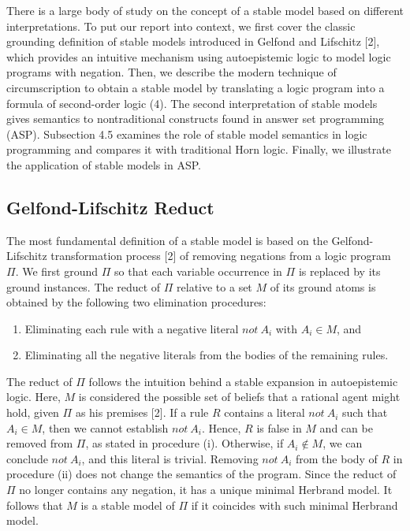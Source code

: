 There is a large body 
of study on the concept of a stable model based on different interpretations. To put our report into 
context, we first cover the classic grounding definition of stable models introduced in Gelfond and Lifschitz [2], 
which provides an intuitive mechanism using autoepistemic logic to model logic programs with negation. 
Then, we describe the modern  
technique of circumscription to obtain a stable model by translating a logic program 
into a formula of second-order logic (4). The second interpretation of stable models gives semantics 
to nontraditional constructs found in answer set programming (ASP). Subsection 4.5 examines the role of 
stable model semantics in logic programming and compares it with traditional Horn logic. Finally, 
we illustrate the application of stable models in ASP. 

\subsection{Gelfond-Lifschitz Reduct}
The most fundamental definition of a stable model is based on the Gelfond-Lifschitz transformation 
process [2] of removing negations from a logic program $\Pi$. 
We first ground $\Pi$ so that each variable occurrence in $\Pi$ is replaced by its ground instances. 
The reduct of $\Pi$ relative to a set $M$ of its ground atoms is obtained by the following two 
elimination procedures:
\begin{enumerate}[label=(\roman*)]
    \item Eliminating each rule with a negative literal $not \: A_i$ with $A_i \in M$, and 
    \item Eliminating all the negative literals from the bodies of the remaining rules.
\end{enumerate}
The reduct of $\Pi$ follows the intuition behind a stable expansion in 
autoepistemic logic. Here, $M$ is considered the possible set of beliefs that a rational 
agent might hold, given $\Pi$ as his premises [2]. If a rule $R$ contains a literal $not \: A_i$ 
such that $A_i \in M$, then we cannot establish $not \: A_i$. Hence, $R$ is false in $M$ and can be 
removed from $\Pi$, as stated in procedure (i). Otherwise, if $A_i \not \in M$, we can conclude 
$not \: A_i$, and this literal is trivial. Removing $not \: A_i$ from the body of $R$ in 
procedure (ii) does not change the semantics of the program. Since the reduct of $\Pi$ no longer 
contains any negation, it has a unique minimal Herbrand model.  
It follows that $M$ is a stable model of $\Pi$ if it coincides with such minimal Herbrand model.

